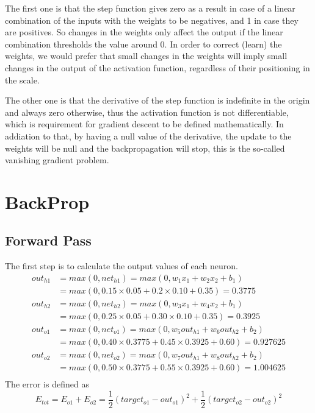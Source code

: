 \documentclass[a4paper]{article}
\begin{document}
The first one is that the step function gives zero as a result in case of a linear combination of the inputs with the weights to be negatives, and 1 in case they are positives. So changes in the weights only affect the output if the linear combination thresholds the value around 0. In order to correct (learn) the weights, we would prefer that small changes in the weights will imply small changes in the output of the activation function, regardless of their positioning in the scale.

The other one is that the derivative of the step function is indefinite in the origin and always zero otherwise, thus the activation function is not differentiable, which is requirement for gradient descent to be defined mathematically. In addiation to that, by having a null value of the derivative, the update to the weights will be null and the backpropagation will stop, this is the so-called vanishing gradient problem.


\section{BackProp}
\subsection{Forward Pass}
The first step is to calculate the output values of each neuron. 
\begin{equation*}
\begin{split}
    out_{h1}    &= max(0,net_{h1}) = max(0, w_1 x_1 + w_2 x_2 + b_1)  \\
                &= max(0,0.15 \times 0.05 + 0.2 \times 0.10 + 0.35) =  0.3775\\
    out_{h2}    &= max(0,net_{h2}) = max(0, w_3 x_1 + w_4 x_2 + b_1) \\
                &= max(0,0.25 \times 0.05 + 0.30 \times 0.10 + 0.35) = 0.3925\\
    out_{o1}    &= max(0,net_{o1}) = max(0, w_5 out_{h1} + w_6 out_{h2} + b_2)\\
                &= max(0,0.40 \times 0.3775 + 0.45 \times 0.3925 + 0.60) = 0.927625\\
    out_{o2}    &= max(0,net_{o2}) = max(0, w_7 out_{h1} + w_8 out_{h2} + b_2)\\
                &= max(0,0.50 \times 0.3775 + 0.55 \times 0.3925 + 0.60) = 1.004625\\
\end{split}  
\end{equation*}
The error is defined as
\begin{equation}
    E_{tot} = E_{o1} + E_{o2} = \frac{1}{2}(target_{o1} - out_{o1})^{2} + \frac{1}{2} (target_{o2} - out_{o2})^{2}
\end{equation}
\end{document}

